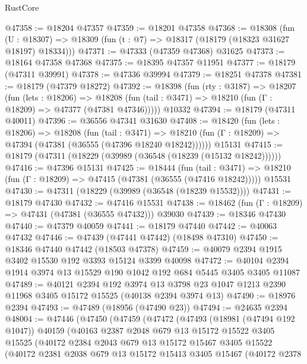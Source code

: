 \begin{lexlean}{RustCore}
\begin{coremodule}
@47358 := @18204 @47357
@47359 := @18201 @47358
@47368 := @18308
    (fun (U : @18307) => @18309 (fun (t : @7) => @18317 (@18179 (@18323 @31627 @18197) @18334)))
@47371 := @47333 (@47359 @47368) @31625
@47373 := @18164 @47358 @47368
@47375 := @18395 @47357 @11951
@47377 := @18179 (@47311 @39991)
@47378 := @47336 @39994
@47379 := @18251 @47378
@47381 := @18179 (@47379 @18272)
@47392 := @18398
    (fun (rty : @3187) =>
    @18207
      (fun (lets : @18206) =>
      @18208 (fun (tail : @3471) => @18210 (fun (Γ : @18209) => @47377 (@47381 @47346)))))
    @10332
@47394 := @18179 (@47311 @40011)
@47396 := @36556 @47341 @31630
@47408 := @18420
    (fun (lets : @18206) =>
    @18208
      (fun (tail : @3471) =>
      @18210 (fun (Γ : @18209) => @47394 (@47381 (@36555 (@47396 @18240 @18242))))))
    @15131
@47415 := @18179 (@47311 (@18229 (@39989 (@36548 (@18239 (@15132 @18242))))))
@47416 := @47396 @15131
@47425 := @18444
    (fun (tail : @3471) => @18210 (fun (Γ : @18209) => @47415 (@47381 (@36555 (@47416 @18242)))))
    @15531
@47430 := @47311 (@18229 (@39989 (@36548 (@18239 @15532))))
@47431 := @18179 @47430
@47432 := @47416 @15531
@47438 := @18462 (fun (Γ : @18209) => @47431 (@47381 (@36555 @47432))) @39030
@47439 := @18346 @47430
@47440 := @47379 @40059
@47441 := @18179 @47440
@47442 := @40063 @47432
@47446 := @47439 (@47441 @47442) (@18498 @47310)
@47450 := @18346 @47440 @47442 (@18503 @47378)
@47459 := @40079 @2394 @1915 @3402 @15530 @192 @3393 @15124 @3399 @40098
@47472 := @40104 @2394 @1914 @3974 @13 @15529 @190 @1042 @192 @684 @5445 @3405 @3405 @11087
@47489 := @40121
    @2394
    @192
    @3974
    @13
    @3798
    @23
    @1047
    @1213
    @2390
    @11968
    @3405
    @15172
    @15525
    (@40138 @2394 @3974 @13)
@47490 := @18976 @2394
@47493 := @47489 (@18956 (@47490 @23))
@47494 := @24635 @2394
@48004 := @47446
    (@47450
      (@47459
        (@47472
          (@47493
            (@18981 (@47494 @192 @1047))
            @40159
            (@40163
              @2387
              @2048
              @679
              @13
              @15172
              @15522
              @3405
              @15525
              (@40172
                @2384
                @2043
                @679
                @13
                @15172
                @15467
                @3405
                @15522
                (@40172
                  @2381
                  @2038
                  @679
                  @13
                  @15172
                  @15413
                  @3405
                  @15467
                  (@40172
                    @2378

\end{coremodule}
\end{lexlean}
